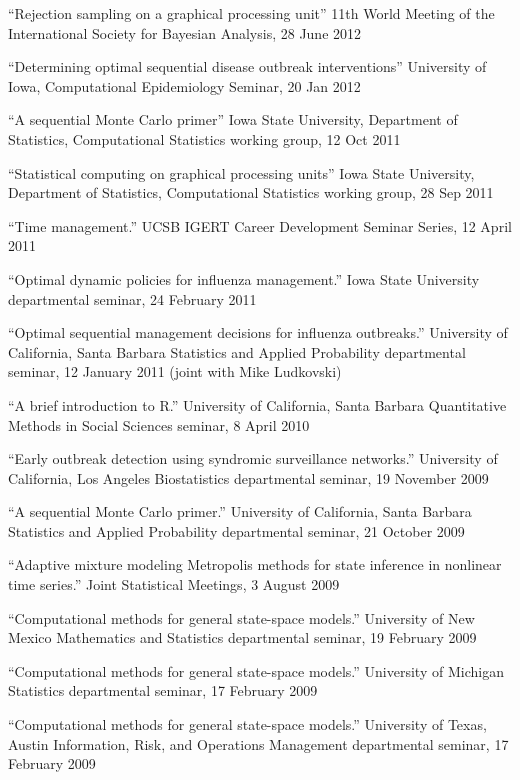 \documentclass[overlapped,line]{res}
\newcommand{\sinceappt}{}
\begin{document}
\begin{resume}
{``Rejection sampling on a graphical processing unit'' 11th World Meeting of the International Society for Bayesian Analysis, 28 June 2012 

``Determining optimal sequential disease outbreak interventions'' University of Iowa, Computational Epidemiology Seminar, 20 Jan 2012 

\sinceappt

``A sequential Monte Carlo primer'' Iowa State University, Department of Statistics, Computational Statistics working group, 12 Oct 2011 

``Statistical computing on graphical processing units'' Iowa State University, Department of Statistics, Computational Statistics working group, 28 Sep 2011 

``Time management.'' UCSB IGERT Career Development Seminar Series, 12 April 2011 

``Optimal dynamic policies for influenza management.'' Iowa State University departmental seminar, 24 February 2011 

``Optimal sequential management decisions for influenza outbreaks.'' University of California, Santa Barbara Statistics and Applied Probability departmental seminar, 12 January 2011 (joint with Mike Ludkovski)

``A brief introduction to R.'' University of California, Santa Barbara Quantitative Methods in Social Sciences seminar, 8 April 2010 

``Early outbreak detection using syndromic surveillance networks.'' University of California, Los Angeles Biostatistics departmental seminar, 19 November 2009 

``A sequential Monte Carlo primer.'' University of California, Santa Barbara Statistics and Applied Probability departmental seminar, 21 October 2009 

``Adaptive mixture modeling Metropolis methods for state inference in nonlinear time series.'' Joint Statistical Meetings, 3 August 2009 


``Computational methods for general state-space models.'' University of New Mexico Mathematics and Statistics departmental seminar, 19 February 2009 

``Computational methods for general state-space models.'' University of Michigan Statistics departmental seminar, 17 February 2009 

``Computational methods for general state-space models.'' University of Texas, Austin Information, Risk, and Operations Management departmental seminar, 17 February 2009 

}
\end{resume}
\end{document}
